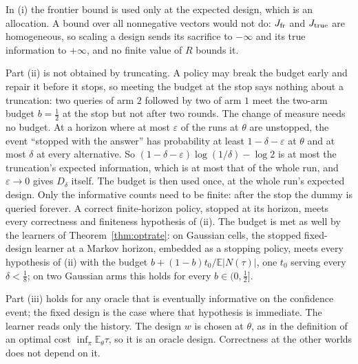 In (i) the frontier bound is used only at the expected design, which is an allocation. A
bound over all nonnegative vectors would not do: $J_{\rm fr}$ and $J_{\rm true}$ are
homogeneous, so scaling a design sends its sacrifice to $-\infty$ and its true information to
$+\infty$, and no finite value of $R$ bounds it.

Part (ii) is not obtained by truncating. A policy may break the budget early and repair it
before it stops, so meeting the budget at the stop says nothing about a truncation: two queries
of arm $2$ followed by two of arm $1$ meet the two-arm budget $b=\frac12$ at the stop but not
after two rounds. The change of measure needs no budget. At a horizon where at most $\varepsilon$
of the runs at $\theta$ are unstopped, the event ``stopped with the answer'' has probability at
least $1-\delta-\varepsilon$ at $\theta$ and at most $\delta$ at every alternative. So
$(1-\delta-\varepsilon)\log(1/\delta)-\log2$ is at most the truncation's expected information,
which is at most that of the whole run, and $\varepsilon\to0$ gives $D_\delta$ itself. The budget
is then used once, at the whole run's expected design. Only the informative counts need to be
finite: after the stop the dummy is queried forever. A correct finite-horizon policy, stopped
at its horizon, meets every correctness and finiteness hypothesis of (ii). The budget is met as
well by the learners of Theorem~\ref{thm:optrate}: on Gaussian cells, the stopped fixed-design
learner at a Markov horizon, embedded as a stopping policy, meets every hypothesis of (ii) with
the budget $b+(1-b)t_0/\mathbb E|N(\tau)|$, one $t_0$ serving every $\delta<\frac18$; on two
Gaussian arms this holds for every $b\in(0,\frac12]$.

Part (iii) holds for any oracle that is eventually informative on the confidence event; the
fixed design is the case where that hypothesis is immediate. The learner reads only the
history. The design $w$ is chosen at $\theta$, as in the definition of an optimal cost
$\inf_\pi\mathbb E_\theta\tau$, so it is an oracle design. Correctness at the other worlds does
not depend on it.

